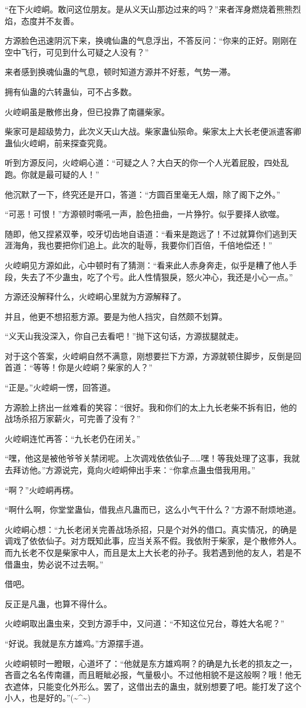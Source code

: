 \begin{this_body}
“在下火崆峒。敢问这位朋友。是从义天山那边过来的吗？”来者浑身燃烧着熊熊烈焰，态度并不友善。

方源脸色迅速阴沉下来，换魂仙蛊的气息浮出，不答反问：“你来的正好。刚刚在空中飞行，可见到什么可疑之人没有？”

来者感到换魂仙蛊的气息，顿时知道方源并不好惹，气势一滞。

拥有仙蛊的六转蛊仙，可不占多数。

火崆峒虽是散修出身，但已投靠了南疆柴家。

柴家可是超级势力，此次义天山大战。柴家蛊仙殒命。柴家太上大长老便派遣客卿蛊仙火崆峒，前来探查究竟。

听到方源反问，火崆峒心道：“可疑之人？大白天的你一个人光着屁股，四处乱跑。你就是最可疑的人！”

他沉默了一下，终究还是开口，答道：“方圆百里毫无人烟，除了阁下之外。”

“可恶！可恨！”方源顿时嘶吼一声，脸色扭曲，一片狰狞。似乎要择人欲噬。

随即，他又捏紧双拳，咬牙切齿地自语道：“看来是跑远了！不过就算你们逃到天涯海角，我也要把你们追上。此次的耻辱，我要你们百倍，千倍地偿还！”

火崆峒见方源如此，心中顿时有了猜测：“看来此人赤身奔走，似乎是糟了他人手段，失去了不少蛊虫，吃了个亏。此人性情狠戾，怒火冲心，我还是小心一点。”

方源还没解释什么，火崆峒心里就为方源解释了。

并且，他更不想招惹方源。要是为他人挡灾，自然颇不划算。

“义天山我没深入，你自己去看吧！”抛下这句话，方源拔腿就走。

对于这个答案，火崆峒自然不满意，刚想要拦下方源，方源就顿住脚步，反倒是回首道：“等等！你是火崆峒？柴家的人？”

“正是。”火崆峒一愣，回答道。

方源脸上挤出一丝难看的笑容：“很好。我和你们的太上九长老柴不拆有旧，他的战场杀招万家薪火，可完善了没有？”

火崆峒连忙再答：“九长老仍在闭关。”

“嘿，他这是被他爷爷关禁闭呢。上次调戏依依仙子……嘿！等我处理了这事，我就去拜访他。”方源说完，竟向火崆峒伸出手来：“你拿点蛊虫借我用用。”

“啊？”火崆峒再楞。

“啊什么啊，你堂堂蛊仙，借我点凡蛊而已，这么小气干什么？”方源不耐烦地道。

火崆峒心想：“九长老闭关完善战场杀招，只是个对外的借口。真实情况，的确是调戏了依依仙子。对方既知此事，应当关系不假。我依附于柴家，是个散修外人。而九长老不仅是柴家中人，而且是太上大长老的孙子。我若遇到他的友人，若是不借蛊虫，势必说不过去啊。”

借吧。

反正是凡蛊，也算不得什么。

火崆峒取出蛊虫来，交到方源手中，又问道：“不知这位兄台，尊姓大名呢？”

“好说。我就是东方雄鸡。”方源摆手道。

火崆峒顿时一瞪眼，心道坏了：“他就是东方雄鸡啊？的确是九长老的损友之一，吝啬之名名传南疆，而且睚眦必报，气量极小。不过他相貌不是这般啊？哦！他无衣遮体，只能变化外形么。罢了，这借出去的蛊虫，就别想要了吧。能打发了这个小人，也是好的。”(\~{}\^{}\~{})

\end{this_body}

